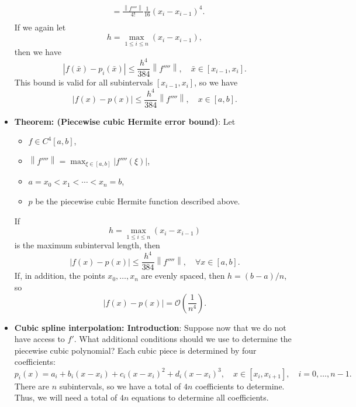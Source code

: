 \documentclass{report}
\begin{document}
\begin{itemize}
$$\begin{align}
& = \frac{\left\|f''''\right\|}{4!} \frac{1}{16}(x_i - x_{i-1})^4.\\
            \end{align}
            $$
            If we again let 
            $$h = \max_{1 \leq i \leq n} (x_i - x_{i-1}),$$
            then we have 
            $$
            \left|f(\bar x) - p_i(\bar x)\right| \leq \frac{h^4}{384} \left\|f''''\right\|, 
            \quad \bar x \in [x_{i-1}, x_i].
            $$
            This bound is valid for all subintervals $[x_{i-1}, x_i]$, so we have
            $$
            \left|f(x) - p(x)\right| \leq \frac{h^4}{384} \left\|f''''\right\|, 
            \quad x \in [a, b].
            $$
        \item \textbf{Theorem: (Piecewise cubic Hermite error bound)}:
             Let 
             \begin{itemize}
                 \item $f \in C^4[a,b]$,
                 \item $\left\|f''''\right\| = \max_{\xi \in [a,b]} \left|f''''(\xi)\right|$,
                 \item $a = x_0 < x_1 < \cdots < x_n = b$,
                 \item $p$ be the piecewise cubic Hermite function described above.
             \end{itemize}
             If
             $$h = \max_{1 \leq i \leq n} (x_i - x_{i-1})$$
             is the maximum subinterval length, then
             $$\left|f(x) - p(x)\right| \leq \frac{h^4}{384} \left\|f''''\right\|, \quad \forall x \in [a,b].$$
             If, in addition, the points $x_0,\ldots,x_n$ are evenly spaced, then $h = (b-a)/n$, so
             $$\left|f(x) - p(x)\right| = \mathcal{O}\left(\frac{1}{n^4}\right).$$
        \item \textbf{Cubic spline interpolation: Introduction}:
            Suppose now that we do not have access to $f'$.
            \bigbreak \noindent 
            What additional conditions should we use to determine the piecewise cubic polynomial?
            \bigbreak \noindent 
            Each cubic piece is determined by four coefficients:
            \bigbreak \noindent 
            $$p_i(x) = a_i + b_i(x-x_i) + c_i(x-x_i)^2 + d_i(x-x_i)^3, \quad x \in [x_i,x_{i+1}], \quad i=0,\ldots,n-1.$$
            \bigbreak \noindent 
            There are $n$ subintervals, so we have a total of $4n$ coefficients to determine.
            \bigbreak \noindent 
            Thus, we will need a total of $4n$ equations to determine all coefficients.

\end{itemize}
\end{document}
